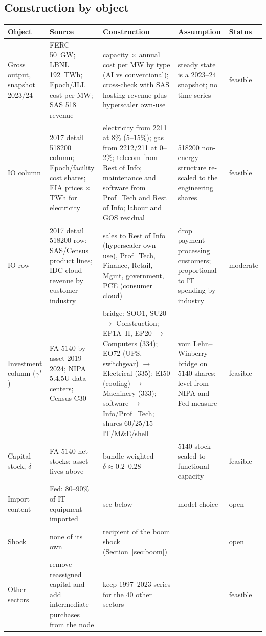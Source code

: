 \documentclass[11pt]{article}
\begin{document}
\subsection{Construction by object}
\begin{center}\footnotesize
\begin{tabular}{p{2.2cm}p{3.5cm}p{3.6cm}p{3.0cm}p{2.0cm}}
\toprule
Object & Source & Construction & Assumption & Status \\
\midrule
Gross output, snapshot 2023/24 & FERC 50~GW; LBNL 192~TWh; Epoch/JLL cost per MW; SAS 518 revenue & capacity $\times$ annual cost per MW by type (AI vs conventional); cross-check with SAS hosting revenue plus hyperscaler own-use & steady state is a 2023--24 snapshot; no time series & feasible \\
IO column & 2017 detail 518200 column; Epoch/facility cost shares; EIA prices $\times$ TWh for electricity & electricity from 2211 at 8\% (5--15\%); gas from 2212/211 at 0--2\%; telecom from Rest of Info; maintenance and software from Prof\_Tech and Rest of Info; labour and GOS residual & 518200 non-energy structure re-scaled to the engineering shares & feasible \\
IO row & 2017 detail 518200 row; SAS/Census product lines; IDC cloud revenue by customer industry & sales to Rest of Info (hyperscaler own use), Prof\_Tech, Finance, Retail, Mgmt, government, PCE (consumer cloud) & drop payment-processing customers; proportional to IT spending by industry & moderate \\
Investment column ($\gamma^I$) & FA 5140 by asset 2019--2024; NIPA 5.4.5U data centers; Census C30 & bridge: SOO1, SU20 $\to$ Construction; EP1A--H, EP20 $\to$ Computers (334); EO72 (UPS, switchgear) $\to$ Electrical (335); EI50 (cooling) $\to$ Machinery (333); software $\to$ Info/Prof\_Tech; shares 60/25/15 IT/M\&E/shell & vom Lehn--Winberry bridge on 5140 shares; level from NIPA and Fed measure & feasible \\
Capital stock, $\delta$ & FA 5140 net stocks; asset lives above & bundle-weighted $\delta \approx 0.2$--0.28 & 5140 stock scaled to functional capacity & feasible \\
Import content & Fed: 80--90\% of IT equipment imported & see below & model choice & open \\
Shock & none of its own & recipient of the boom shock (Section~\ref{sec:boom}) & & open \\
Other sectors & remove reassigned capital and add intermediate purchases from the node & keep 1997--2023 series for the 40 other sectors & & feasible \\
\bottomrule
\end{tabular}
\end{center}
\end{document}
